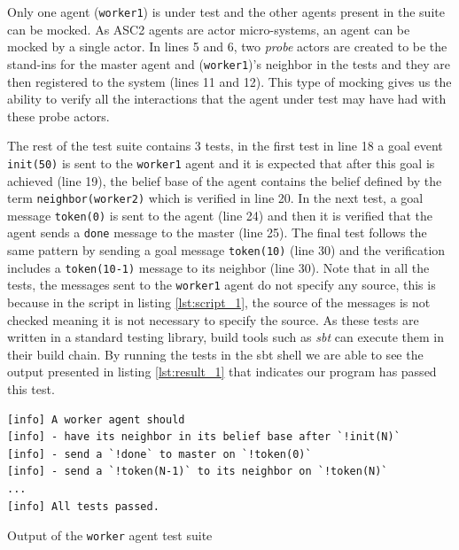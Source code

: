 Only one agent (\texttt{worker1}) is under test and the other agents present in the suite can be mocked. As ASC2 agents are actor micro-systems, an agent can be mocked by a single actor. In lines 5 and 6, two \textit{probe} actors are created to be the stand-ins for the master agent and (\texttt{worker1})'s neighbor in the tests and they are then registered to the system (lines 11 and 12). This type of mocking gives us the ability to verify all the interactions that the agent under test may have had with these probe actors.


The rest of the test suite contains 3 tests, in the first test in line 18 a goal event \texttt{init(50)} is sent to the \texttt{worker1} agent and it is expected that after this goal is achieved (line 19), the belief base of the agent contains the belief defined by the term \texttt{neighbor(worker2)} which is verified in line 20. In the next test, a goal message \texttt{token(0)} is sent to the agent (line 24) and then it is verified that the agent sends a \texttt{done} message to the master (line 25). The final test follows the same pattern by sending a goal message \texttt{token(10)} (line 30) and the verification includes a \texttt{token(10-1)} message to its neighbor (line 30). Note that in all the tests, the messages sent to the \texttt{worker1} agent do not specify any source, this is because in the script in listing \ref{lst:script_1}, the source of the messages is not checked meaning it is not necessary to specify the source. As these tests are written in a standard testing library, build tools such as \textit{sbt} can execute them in their build chain. By running the tests in the sbt shell we are able to see the output presented in listing \ref{lst:result_1} that indicates our program has passed this test.

\begin{listing}[!h]
\begin{Verbatim}[fontsize=\small]
[info] A worker agent should
[info] - have its neighbor in its belief base after `!init(N)`
[info] - send a `!done` to master on `!token(0)`
[info] - send a `!token(N-1)` to its neighbor on `!token(N)`
...
[info] All tests passed.
\end{Verbatim}
\vspace{-5pt}
    \caption{Output of the \texttt{worker} agent test suite}
    \label{lst:result_1}
\vspace{-5pt}
\end{listing}





